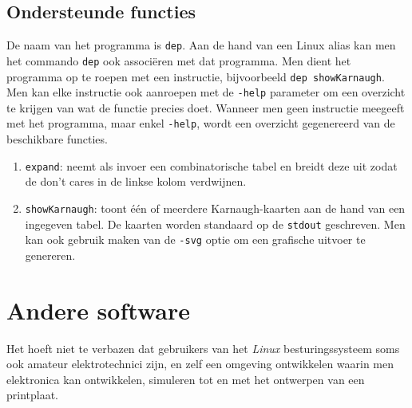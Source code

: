 \subsection{Ondersteunde functies}
De naam van het programma is \texttt{dep}. Aan de hand van een Linux alias kan men het commando \texttt{dep} ook associ\"eren met dat programma. Men dient het programma op te roepen met een instructie, bijvoorbeeld \texttt{dep showKarnaugh}. Men kan elke instructie ook aanroepen met de \texttt{-help} parameter om een overzicht te krijgen van wat de functie precies doet. Wanneer men geen instructie meegeeft met het programma, maar enkel \texttt{-help}, wordt een overzicht gegenereerd van de beschikbare functies.
\begin{enumerate}
 \item \texttt{expand}: neemt als invoer een combinatorische tabel en breidt deze uit zodat de don't cares in de linkse kolom verdwijnen.
 \item \texttt{showKarnaugh}: toont \'e\'en of meerdere Karnaugh-kaarten aan de hand van een ingegeven tabel. De kaarten worden standaard op de \texttt{stdout} geschreven. Men kan ook gebruik maken van de \texttt{-svg} optie om een grafische uitvoer te genereren.
\end{enumerate}

\section{Andere software}
Het hoeft niet te verbazen dat gebruikers van het \emph{Linux} besturingssysteem soms ook amateur elektrotechnici zijn, en zelf een omgeving ontwikkelen waarin men elektronica kan ontwikkelen, simuleren tot en met het ontwerpen van een printplaat.